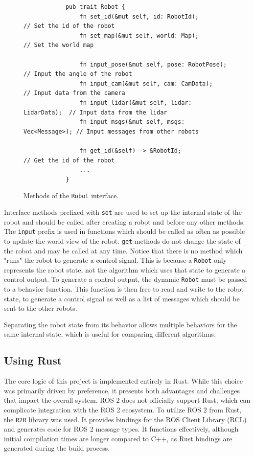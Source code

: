 \begin{figure}[H]
    \begin{center}
        \begin{verbatim}
            pub trait Robot {
                fn set_id(&mut self, id: RobotId);            // Set the id of the robot
                fn set_map(&mut self, world: Map);            // Set the world map

                fn input_pose(&mut self, pose: RobotPose);    // Input the angle of the robot
                fn input_cam(&mut self, cam: CamData);        // Input data from the camera
                fn input_lidar(&mut self, lidar: LidarData);  // Input data from the lidar
                fn input_msgs(&mut self, msgs: Vec<Message>); // Input messages from other robots

                fn get_id(&self) -> &RobotId;                 // Get the id of the robot
                ...
            }
        \end{verbatim}
    \end{center}
    \caption{Methods of the \texttt{Robot} interface.}\label{fig:robot-interface}
\end{figure}

Interface methods prefixed with \texttt{set} are used to set up the internal state of the robot and should be called after creating a robot and before any other methods. The \texttt{input} prefix is used in functions which should be called as often as possible to update the world view of the robot. \texttt{get}-methods do not change the state of the robot and may be called at any time. Notice that there is no method which "runs" the robot to generate a control signal. This is because a \texttt{Robot} only represents the robot state, not the algorithm which uses that state to generate a control output. To generate a control output, the dynamic \texttt{Robot} must be passed to a behavior function. This function is then free to read and write to the robot state, to generate a control signal as well as a list of messages which should be sent to the other robots.

Separating the robot state from its behavior allows multiple behaviors for the same internal state, which is useful for comparing different algorithms.

\subsection{Using Rust}
The core logic of this project is implemented entirely in Rust. While this choice was primarily driven by preference, it presents both advantages and challenges that impact the overall system. ROS 2 does not officially support Rust, which can complicate integration with the ROS 2 ecosystem. To utilize ROS 2 from Rust, the \texttt{R2R} library \cite{r2r} was used. It provides bindings for the ROS Client Library (RCL) and generates code for ROS 2 message types. It functions effectively, although initial compilation times are longer compared to C++, as Rust bindings are generated during the build process. \\


